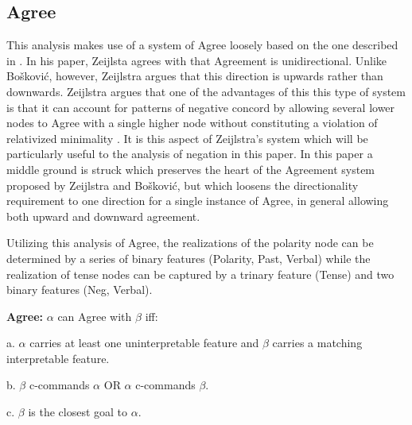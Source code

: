 \documentclass[output=paper]{langsci/langscibook}
\begin{document}


\subsection{Agree}\label{sec:burkholder:2.1}

This analysis makes use of a system of Agree loosely based on the one described in \citet{Zeijlstra2010}. In his paper, Zeijlsta agrees with \citet{Boskovic2007} that Agreement is unidirectional. Unlike Bošković, however, Zeijlstra argues that this direction is upwards rather than downwards. Zeijlstra argues that one of the advantages of this this type of system is that it can account for patterns of negative concord by allowing several lower nodes to Agree with a single higher node without constituting a violation of relativized minimality \citep{Rizzi1989}. It is this aspect of Zeijlstra's system which will be particularly useful to the analysis of negation in this paper. In this paper a middle ground is struck which preserves the heart of the Agreement system proposed by Zeijlstra and Bošković, but which loosens the directionality requirement to one direction for a single instance of Agree, in general allowing both upward and downward agreement.

Utilizing this analysis of Agree, the realizations of the polarity node can be determined by a series of binary features (Polarity, Past, Verbal) while the realization of tense nodes can be captured by a trinary feature (Tense) and two binary features (Neg, Verbal).






\begin{exe}
\ex\label{ex:burkholder:3}  
\textbf{Agree:} $\alpha$ can Agree with $\beta$ iff:


a. $\alpha$ carries at least one uninterpretable feature and $\beta$ carries a matching interpretable feature.


b. $\beta$ c-commands $\alpha$ OR $\alpha$ c-commands $\beta$.


c. $\beta$ is the closest goal to $\alpha$.
\end{exe}
\end{document}
